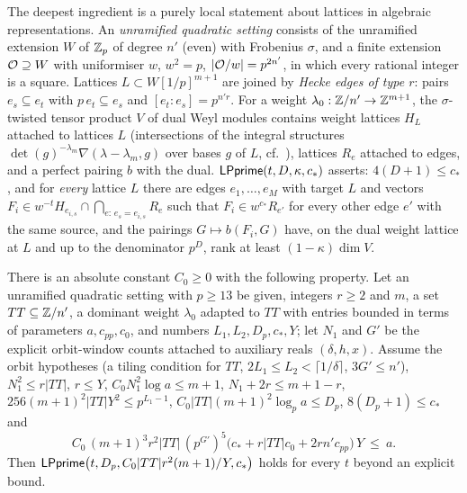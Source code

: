 The deepest ingredient is a purely local statement about lattices in algebraic representations. An
\emph{unramified quadratic setting} consists of the unramified extension $W$ of $\mathbb{Z}_p$ of degree $n'$ (even) with
Frobenius $\sigma$, and a finite extension $\mathcal{O}\supseteq W$ with uniformiser $w$, $w^2=p$, $|\mathcal{O}/w|=p^{2n'}$, in
which every rational integer is a square. Lattices $L\subset W[1/p]^{m+1}$ are joined by \emph{Hecke edges of type
$r$}: pairs $e_s\subseteq e_t$ with $p\,e_t\subseteq e_s$ and $[e_t:e_s]=p^{n'r}$. For a weight
$\lambda_0:\mathbb{Z}/n'\to\mathbb{Z}^{m+1}$, the $\sigma$-twisted tensor product $V$ of dual Weyl modules contains weight
lattices $H_L$ attached to lattices $L$ (intersections of the integral structures
$\det(g)^{-\lambda_m}\nabla(\lambda-\lambda_m,g)$ over bases $g$ of $L$, cf.\ \cite{Jantzen2003}), lattices $R_e$
attached to edges, and a perfect pairing $b$ with the dual. $\mathsf{LPprime}(t,D,\kappa,c_*)$ asserts:
$4(D+1)\le c_*$, and for \emph{every} lattice $L$ there are edges $e_1,\dots,e_M$ with target $L$ and vectors
$F_i\in w^{-t}H_{e_{i,s}}\cap\bigcap_{e:\,e_s=e_{i,s}}R_e$ such
that $F_i\in w^{c_*}R_{e'}$ for every other edge $e'$ with the same source, and the pairings $G\mapsto b(F_i,G)$
have, on the dual weight lattice at $L$ and up to the denominator $p^D$, rank at least $(1-\kappa)\dim V$.

\begin{theorem}\Fmark\label{thm:families:local}
There is an absolute constant $C_0\ge0$ with the following property. Let an unramified quadratic setting with
$p\ge13$ be given, integers $r\ge2$ and $m$, a set $TT\subseteq\mathbb{Z}/n'$, a dominant weight $\lambda_0$ adapted to
$TT$ with entries bounded in terms of parameters $a,c_{pp},c_0$, and numbers $L_1,L_2,D_p,c_*,Y$; let $N_1$ and
$G'$ be the explicit orbit-window counts attached to auxiliary reals $(\delta,h,x)$. Assume the orbit hypotheses (a
tiling condition for $TT$, $2L_1\le L_2<\lceil1/\delta\rceil$, $3G'\le n'$), $N_1^2\le r|TT|$, $r\le Y$,
$C_0N_1^2\log a\le m+1$, $N_1+2r\le m+1-r$, $256(m+1)^2|TT|Y^2\le p^{L_1-1}$, $C_0|TT|(m+1)^2\log_pa\le D_p$,
$8(D_p+1)\le c_*$ and
\[
C_0\,(m+1)^3r^2|TT|\,(p^{G'})^5\bigl(c_*+r|TT|c_0+2rn'c_{pp}\bigr)\,Y\ \le\ a .
\]
Then $\mathsf{LPprime}\bigl(t,D_p,C_0|TT|r^2(m+1)/Y,c_*\bigr)$ holds for every $t$ beyond an explicit bound.
\end{theorem}

